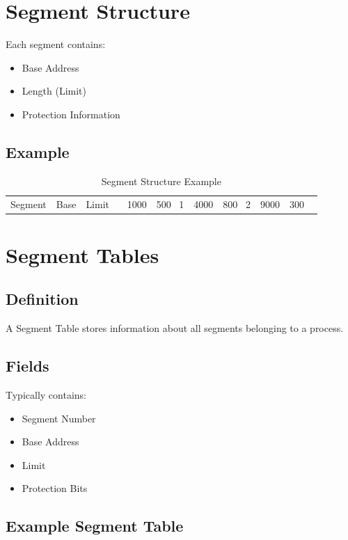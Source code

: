 \section{Segment Structure}

Each segment contains:

\begin{itemize}
\item Base Address
\item Length (Limit)
\item Protection Information
\end{itemize}

\subsection{Example}

\begin{table}[h]
\centering
\begin{tabular}{|c|c|c|}
\hline
Segment & Base & Limit \
 & 1000 & 500 \
1 & 4000 & 800 \
2 & 9000 & 300 \
\hline
\end{tabular}
\caption{Segment Structure Example}
\end{table}

\section{Segment Tables}

\subsection{Definition}

A Segment Table stores information about all segments belonging to a process.

\subsection{Fields}

Typically contains:

\begin{itemize}
\item Segment Number
\item Base Address
\item Limit
\item Protection Bits
\end{itemize}

\subsection{Example Segment Table}

